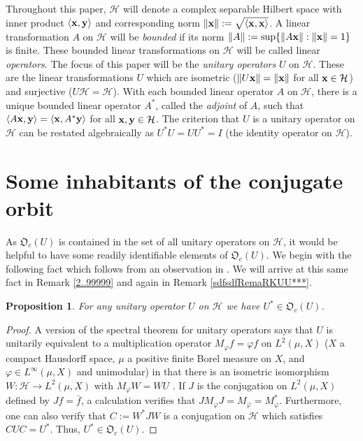 \documentclass{dis}
\theoremstyle{plain}
\newtheorem{Proposition}[equation]{Proposition}
\theoremstyle{definition}
\renewcommand{\phi}{\varphi}
\renewcommand{\vec}[1]{{\bf #1}}
\newcommand{\0}{{\color{lightgray}0}}
\begin{document}
 Throughout  this paper, $\mathcal{H}$ will denote a complex separable Hilbert space with inner product $\langle \vec{x}, \vec{y}\rangle$ and corresponding norm $\|\vec{x}\| := \sqrt{\langle \vec{x}, \vec{x}\rangle}$. A linear transformation $A$ on $\mathcal{H}$ will be {\em bounded} if its norm $\|A\| := \sup\{\|A \vec{x}\|: \|\vec{x}\| = 1\}$
is finite.
These bounded linear transformations on $\mathcal{H}$ will be called linear {\em operators}.
The focus of this paper will be the {\em unitary operators} $U$ on $\mathcal{H}$. These are the linear transformations $U$ which are isometric ($\|U \vec{x}\| = \|\vec{x}\|$ for all $\vec{x} \in \mathcal{H}$) and surjective ($U \mathcal{H} = \mathcal{H}$). With each bounded linear operator $A$ on $\mathcal{H}$, there is a unique bounded linear operator $A^{*}$, called the {\em adjoint} of $A$, such that 
$\langle A \vec{x}, \vec{y}\rangle = \langle \vec{x}, A^{*} \vec{y}\rangle$ for all $\vec{x}, \vec{y} \in \mathcal{H}$. The criterion that $U$ is a unitary operator on $\mathcal{H}$ can be restated  algebraically as $U^{*} U = U U^{*} = I$ (the identity operator on $\mathcal{H}$).


\section{Some inhabitants of the conjugate orbit}


As $\mathfrak{O}_c(U)$ is contained in the set of all unitary operators on $\mathcal{H}$, it would be helpful to have some readily identifiable elements of $\mathfrak{O}_c(U)$. We begin with the following  fact which follows  from an observation in \cite[Sec.~4]{MR2187654}. We will arrive at this same fact in Remark \ref{2..99999} and again in Remark \ref{sdfsdfRemaRKUU***}.

\begin{Proposition}\label{SdfsdfdsfcvvvvVV}
For any unitary operator $U$ on $\mathcal{H}$ we have $U^{*} \in \mathfrak{O}_c(U)$.
\end{Proposition}

\begin{proof}
A version of the spectral theorem for unitary operators says that $U$ is unitarily equivalent to a multiplication operator $M_{\phi} f = \phi f$ on $L^2(\mu, X)$ ($X$ a compact Hausdorff space, $\mu$ a positive finite Borel measure on $X$, and $\phi \in L^{\infty}(\mu, X)$ and unimodular) in that there is an isometric isomorphism $W: \mathcal{H} \to L^2(\mu, X)$  with $M_{\phi} W = W U$ \cite[p.~279]{ConwayFA}. If $J$ is the conjugation on $L^2(\mu, X)$ defined by $J f = \bar{f}$, a calculation verifies that $J M_{\phi} J = M_{\bar{\phi}}  = M_{\phi}^{*}$. Furthermore, one can also verify that $C := W^{*} J W$ is a conjugation on $\mathcal{H}$ which satisfies $C U C = U^{*}$. Thus, $U^{*} \in \mathfrak{O}_c(U)$.
\end{proof}
\end{document}
